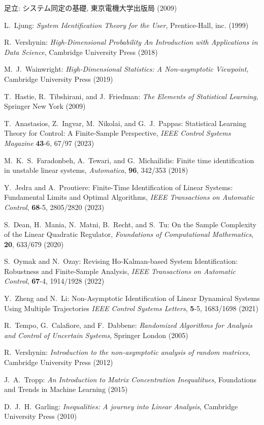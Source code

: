 \documentclass[a4paper,12pt,oneside,openany]{jsbook}
\begin{document}
\begin{thebibliography}{9}

足立: 
システム同定の基礎, 東京電機大学出版局 (2009)

L.~Ljung:
\textit{System Identification Theory for the User},
Prentice-Hall, inc. (1999)

R.~Vershynin:
\textit{High-Dimensional Probability An Introduction with Applications in Data Science}, 
Cambridge University Press (2018)

M.~J.~Wainwright:
\textit{High-Dimensional Statistics: A Non-asymptotic Viewpoint}, 
Cambridge University Press (2019)

T.~Hastie, R.~Tibshirani, and J.~Friedman: 
\textit{The Elements of Statistical Learning},
Springer New York (2009)

T.~Anastasios, Z.~Ingvar, M.~Nikolai, and G.~J.~Pappas:
Statistical Learning Theory for Control: A Finite-Sample Perspective,
\textit{IEEE Control Systems Magazine}
\textbf{43}-6, 67/97 (2023)

M.~K.~S.~Faradonbeh, A.~Tewari, and G.~Michailidis: 
Finite time identification in unstable linear systems, 
\textit{Automatica}, 
\textbf{96}, 342/353 (2018)

Y.~Jedra and A.~Proutiere: 
Finite-Time Identification of Linear Systems: Fundamental Limits and Optimal Algorithms, 
\textit{IEEE Transactions on Automatic Control}, 
\textbf{68}-5, 2805/2820 (2023)

S.~Dean, H.~Mania, N.~Matni, B.~Recht, and S.~Tu: 
On the Sample Complexity of the Linear Quadratic Regulator, 
\textit{Foundations of Computational Mathematics}, 
\textbf{20}, 633/679 (2020)

S.~Oymak and N.~Ozay: 
Revising Ho-Kalman-based System Identification: Robustness and Finite-Sample Analysis, 
\textit{IEEE Transactions on Automatic Control}, 
\textbf{67}-4, 1914/1928 (2022)

Y.~Zheng and N.~Li: 
Non-Asymptotic Identification of Linear Dynamical Systems Using Multiple Trajectories
\textit{IEEE Control Systems Letters}, 
\textbf{5}-5, 1683/1698 (2021)

R.~Tempo, G.~Calafiore, and F.~Dabbene:
\textit{Randomized Algorithms for Analysis and Control of Uncertain Systems}, 
Springer London (2005)

R.~Vershynin:
\textit{Introduction to the non-asymptotic analysis of random matrices}, 
Cambridge University Press (2012)

J.~A.~Tropp:
\textit{An Introduction to Matrix Concentration Inequalitues},
Foundations and Trends in Machine Learning 
(2015)

D.~J.~H.~Garling:
\textit{Inequalities: A journey into Linear Analysis},
Cambridge University Press (2010)

\end{thebibliography}

\clearpage

\appendix

\end{document}
